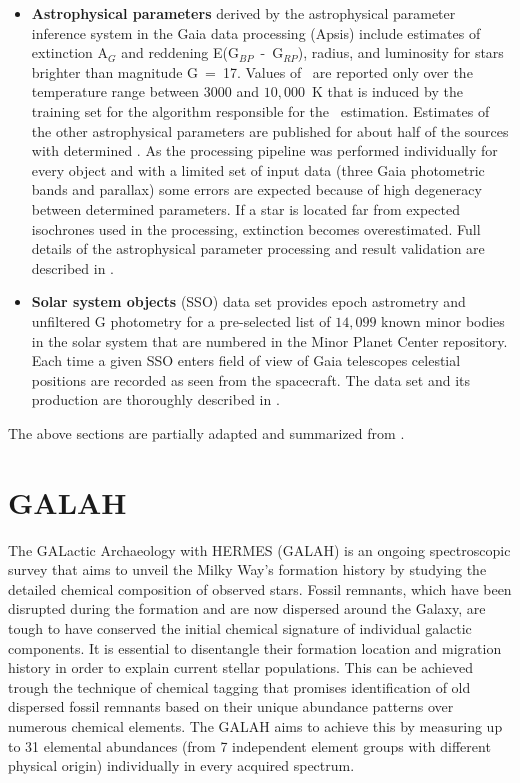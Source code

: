 \begin{itemize}
	\item \textbf{Astrophysical parameters} derived by the astrophysical parameter inference system in the Gaia data processing (Apsis) include estimates of \Teff\, extinction A$_G$ and reddening E(G$_{BP}$~-~G$_{RP}$), radius, and luminosity for stars brighter than magnitude G~=~17. Values of \Teff\ are reported only over the temperature range between $3000$ and $10,000$~K that is induced by the training set for the algorithm responsible for the \Teff\ estimation. Estimates of the other astrophysical parameters are published for about half of the sources with determined \Teff. As the processing pipeline was performed individually for every object and with a limited set of input data (three Gaia photometric bands and parallax) some errors are expected because of high degeneracy between determined parameters. If a star is located far from expected isochrones used in the processing, extinction becomes overestimated. Full details of the astrophysical parameter processing and result validation are described in \citet{2018A&A...616A...8A}.	
	
	\item \textbf{Solar system objects} (SSO) data set provides epoch astrometry and unfiltered G photometry for a pre-selected list of $14,099$ known minor bodies in the solar system that are numbered in the Minor Planet Center repository. Each time a given SSO enters field of view of Gaia telescopes celestial positions are recorded as seen from the spacecraft. The data set and its production are thoroughly described in \citet{2018A&A...616A..13G}.
	
\end{itemize}

The above sections are partially adapted and summarized from \citet{2016A&A...595A...1G, 2018arXiv180409365G, gaia_primer}.

\section{GALAH}
\label{sec:galah_data}
The GALactic Archaeology with HERMES (GALAH) \citep{2015MNRAS.449.2604D} is an ongoing spectroscopic survey that aims to unveil the Milky Way’s formation history by studying the detailed chemical composition of observed stars. Fossil remnants, which have been disrupted during the formation and are now dispersed around the Galaxy, are tough to have conserved the initial chemical signature of individual galactic components. It is essential to disentangle their formation location and migration history in order to explain current stellar populations. This can be achieved trough the technique of chemical tagging \citep{2002ARA&A..40..487F} that promises identification of old dispersed fossil remnants based on their unique abundance patterns over numerous chemical elements. The GALAH aims to achieve this by measuring up to 31 elemental abundances (from 7 independent element groups with different physical origin) individually in every acquired spectrum.

